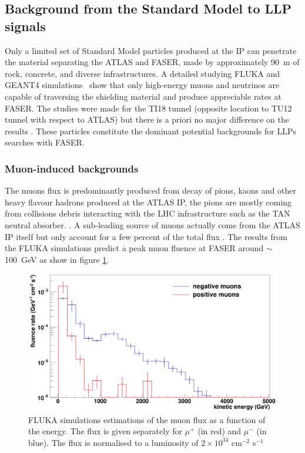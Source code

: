 		\subsection{Background from the Standard Model to LLP signals}
	
		Only a limited set of Standard Model particles produced at the IP can penetrate the material separating the ATLAS and FASER, made by approximately \SI{90}{\metre} of rock, concrete, and diverse infrastructures. A detailed studying FLUKA and GEANT4 simulations~\cite{FASER_techprop, FASER_loi} show that only high-energy muons and neutrinos are capable of traversing the shielding material and produce appreciable rates at FASER. The studies were made for the TI18 tunnel (opposite location to TU12 tunnel with respect to ATLAS) but there is a priori no major difference on the results \cite{FASER_techprop}. These particles constitute the dominant potential backgrounds for LLPs searches with FASER.

			\subsubsection{Muon-induced backgrounds}  
			The muons flux is predominantly produced from decay of pions, kaons and other heavy flavour hadrons produced at the ATLAS IP, the pions are mostly coming from collisions debris interacting with the LHC infrastructure such as the TAN neutral absorber. \cite{FASER_Detector}. A sub-leading source of muons actually come from the ATLAS IP itself but only account for a few percent of the total flux \cite{FASER_techprop}. The results from the FLUKA simulations predict a peak muon fluence at FASER around $\sim$ \SI{100}{\giga\electronvolt} as show in figure \ref{im:muon_flux}.
		
			\begin{figure}[h]
				\centering
				\includegraphics[width=0.8\linewidth]{files/muon_flux}
				\caption{FLUKA simulations estimations of the muon flux as a function of the energy. The flux is given separately for $\mu^+$ (in red) and $\mu^-$ (in blue). The flux is normalised to a luminosity of $2 \times 10^{34}$ cm$^{-2}$ s$^{-1}$}
				\label{im:muon_flux}
			\end{figure}
			
